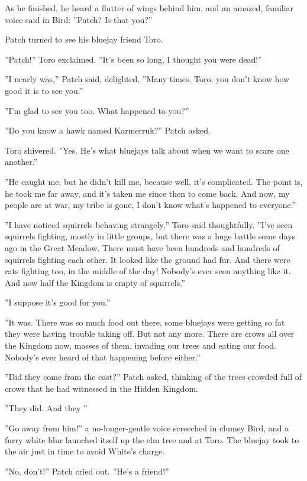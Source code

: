 \documentclass[11pt]{article}
\begin{document}
 As he finished, he heard a flutter of wings behind him, and an amazed, familiar voice said in Bird: ''Patch? Is that you?''\par
 Patch turned to see his bluejay friend Toro.\par
 ''Patch!'' Toro exclaimed. ''It's been so long, I thought you were dead!''\par
 ''I nearly was,'' Patch said, delighted. ''Many times. Toro, you don't know how good it is to see you.''\par
 ''I'm glad to see you too. What happened to you?''\par
 ''Do you know a hawk named Karmerruk?'' Patch asked.\par
 Toro shivered. ''Yes. He's what bluejays talk about when we want to scare one another.''\par
 ''He caught me, but he didn't kill me, because %
 well, it's complicated. The point is, he took me far away, and it's taken me since then to come back. And now, my people are at war, my tribe is gone, I don't know what's happened to everyone.''\par
 ''I have noticed squirrels behaving strangely,'' Toro said thoughtfully. ''I've seen squirrels fighting, mostly in little groups, but there was a huge battle some days ago in the Great Meadow. There must have been hundreds and hundreds of squirrels fighting each other. It looked like the ground had fur. And there were rats fighting too, in the middle of the day! Nobody's ever seen anything like it. And now half the Kingdom is empty of squirrels.''\par
 ''I suppose it's good for you.''\par
 ''It was. There was so much food out there, some bluejays were getting so fat they were having trouble taking off. But not any more. There are crows all over the Kingdom now, masses of them, invading our trees and eating our food. Nobody's ever heard of that happening before either.''\par
 ''Did they come from the east?'' Patch asked, thinking of the trees crowded full of crows that he had witnessed in the Hidden Kingdom.\par
 ''They did. And they %
''\par
 ''Go away from him!'' a no-longer-gentle voice screeched in clumsy Bird, and a furry white blur launched itself up the elm tree and at Toro. The bluejay took to the air just in time to avoid White's charge.\par
 ''No, don't!'' Patch cried out. ''He's a friend!''\par
\end{document}
